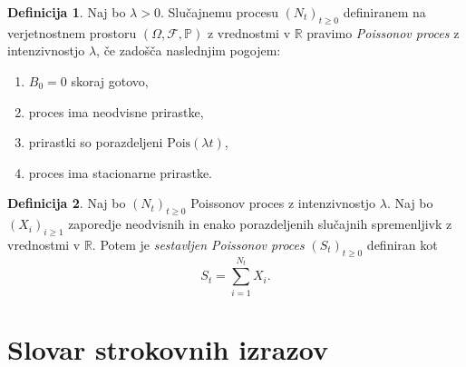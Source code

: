 \documentclass[12pt,a4paper]{amsart}
\theoremstyle{definition} %
\newtheorem{definicija}{Definicija}[section]
\theoremstyle{plain} %
\newcommand{\geslo}[2]{\noindent\textbf{#1}\hspace*{3mm}\hangindent=\parindent\hangafter=1 #2}
\newcommand{\1}{\mathds{1}}
\newcommand{\Pois}[1]{\text{Pois}(#1)}
\begin{document}
    \begin{definicija}
        Naj bo $\lambda > 0$. Slučajnemu procesu $(N_t)_{t\geq 0}$ definiranem na verjetnostnem 
        prostoru $(\Omega, \mathcal{F}, \mathbb{P})$ z vrednostmi v $\mathbb{R}$ pravimo 
        \textit{Poissonov proces} z intenzivnostjo $\lambda$, če zadošča naslednjim pogojem:
        \begin{enumerate}
            \item $B_0 = 0$ skoraj gotovo,
            \item proces ima neodvisne prirastke,
            \item prirastki so porazdeljeni $\Pois{\lambda t}$,
            \item proces ima stacionarne prirastke.
        \end{enumerate}
    \end{definicija}

    \begin{definicija}
        Naj bo $(N_t)_{t\geq0}$ Poissonov proces z intenzivnostjo $\lambda$. 
        Naj bo $(X_i)_{i\geq1}$ zaporedje neodvisnih in enako porazdeljenih slučajnih spremenljivk 
        z vrednostmi v $\mathbb{R}$. Potem je \textit{sestavljen Poissonov proces} 
        $(S_t)_{t\geq0}$ definiran kot
        $$
            S_t = \sum_{i=1}^{N_t} X_i.
        $$
    \end{definicija}


\section*{Slovar strokovnih izrazov}

%
%


\begin{thebibliography}{99}


\end{thebibliography}
\end{document}
